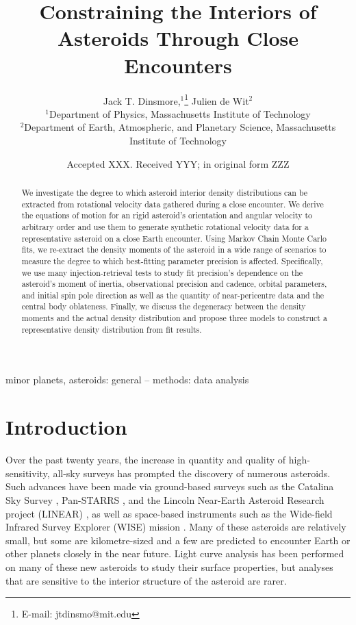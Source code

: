 \documentclass[fleqn,usenatbib]{mnras}
\title[Flyby Constraints on Asteroids Interiors]{Constraining the Interiors of Asteroids Through Close Encounters}
\author[Jack T. Dinsmore, Julien de Wit]{
Jack T. Dinsmore,$^{1}$\thanks{E-mail: jtdinsmo@mit.edu}
Julien de Wit$^{2}$
\\
$^{1}$Department of Physics, Massachusetts Institute of Technology\\
$^{2}$Department of Earth, Atmospheric, and Planetary Science, Massachusetts Institute of Technology
}
\date{Accepted XXX. Received YYY; in original form ZZZ}
\begin{document}
\label{firstpage}
\pagerange{\pageref{firstpage}--\pageref{lastpage}}
\maketitle

\begin{abstract}
  We investigate the degree to which asteroid interior density distributions can be extracted from rotational velocity data gathered during a close encounter. We derive the equations of motion for an rigid asteroid's orientation and angular velocity to arbitrary order and use them to generate synthetic rotational velocity data for a representative asteroid on a close Earth encounter. Using Markov Chain Monte Carlo fits, we re-extract the density moments of the asteroid in a wide range of scenarios to measure the degree to which best-fitting parameter precision is affected. Specifically, we use many injection-retrieval tests to study fit precision's dependence on the asteroid's moment of inertia, observational precision and cadence, orbital parameters, and initial spin pole direction as well as the quantity of near-pericentre data and the central body oblateness. Finally, we discuss the degeneracy between the density moments and the actual density distribution and propose three models to construct a representative density distribution from fit results.
\end{abstract}

\begin{keywords}
  minor planets, asteroids: general -- methods: data analysis
\end{keywords}



\section{Introduction}

Over the past twenty years, the increase in quantity and quality of high-sensitivity, all-sky surveys has prompted the discovery of numerous asteroids. Such advances have been made via ground-based surveys such as the Catalina Sky Survey \cite{larson1998catalina}, Pan-STARRS \cite{kaiser2002pan}, and the Lincoln Near-Earth Asteroid Research project (LINEAR) \cite{stokes2000lincoln}, as well as space-based instruments such as the Wide-field Infrared Survey Explorer (WISE) mission \cite{wright2010wide}. Many of these asteroids are relatively small, but some are kilometre-sized and a few are predicted to encounter Earth or other planets closely in the near future. Light curve analysis has been performed on many of these new asteroids to study their surface properties, but analyses that are sensitive to the interior structure of the asteroid are rarer.
\end{document}

